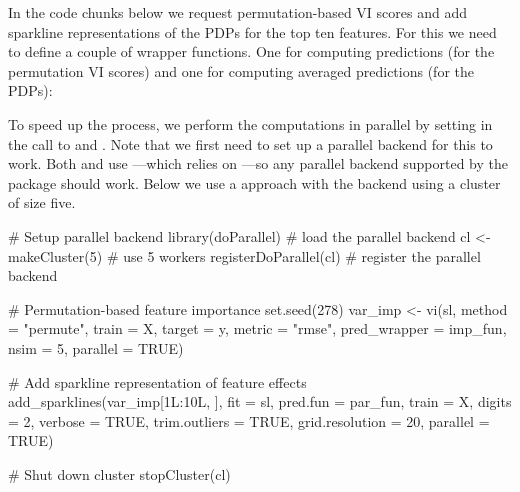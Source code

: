 
In the code chunks below we request permutation-based VI scores and add sparkline representations of the PDPs for the top ten features. For this we need to define a couple of wrapper functions. One for computing predictions (for the permutation VI scores) and one for computing averaged predictions (for the PDPs):


To speed up the process, we perform the computations in parallel by setting  in the call to  and . Note that we first need to set up a parallel backend for this to work. Both  and  use  \citep{plyr-pkg}---which relies on  \citep{foreach-pkg}---so any parallel backend supported by the  package should work. Below we use a  approach with the  backend \citep{doParallel-pkg} using a cluster of size five.

\begin{example}
# Setup parallel backend
library(doParallel) # load the parallel backend
cl <- makeCluster(5) # use 5 workers
registerDoParallel(cl) # register the parallel backend

# Permutation-based feature importance
set.seed(278)
var_imp <- vi(sl, method = "permute", train = X, target = y, metric = "rmse",
              pred_wrapper = imp_fun, nsim = 5, parallel = TRUE)

# Add sparkline representation of feature effects
add_sparklines(var_imp[1L:10L, ], fit = sl, pred.fun = par_fun, train = X, 
               digits = 2, verbose = TRUE, trim.outliers = TRUE, 
               grid.resolution = 20, parallel = TRUE)
               
# Shut down cluster
stopCluster(cl)
\end{example}

